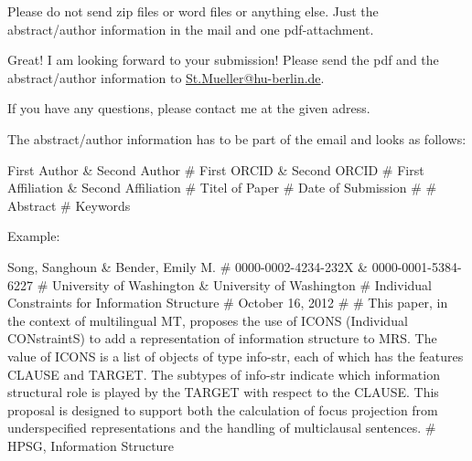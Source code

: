 \documentclass[11pt,a4paper,fleqn]{article}
\begin{document}
Please do not send zip files
or word files or anything else. Just the abstract/author information in the mail and one pdf-attachment.



Great! I am looking forward to your submission!
Please send the pdf and the abstract/author information to\newline
\href{mailto:St.Mueller@hu-berlin.de}{St.Mueller@hu-berlin.de}. 


If you have any questions, please contact me at the given adress.

\newpage

\noindent
The abstract/author information has to be part of the email and looks as follows:

First Author \& Second Author \# First ORCID \& Second ORCID \# First Affiliation \& Second Affiliation \# Titel of Paper \# Date of
Submission \# \# Abstract \# Keywords

\bigskip

Example:

\medskip
\noindent
Song, Sanghoun \& Bender, Emily M. \# 0000-0002-4234-232X \& 0000-0001-5384-6227 \# University of Washington \& University of Washington \#
Individual Constraints for Information Structure \# October 16, 2012 \# \#
This paper, in the context of multilingual MT, proposes the use of ICONS
(Individual CONstraintS) to add a representation of information structure to
MRS. The value of ICONS is a list of objects of type info-str, each of which
has the features CLAUSE and TARGET. The subtypes of info-str indicate
which information structural role is played by the TARGET with respect
to the CLAUSE. This proposal is designed to support both the calculation
of focus projection from underspecified representations and the handling of
multiclausal sentences. \# HPSG, Information Structure

\medskip



% 
%
\end{document}

